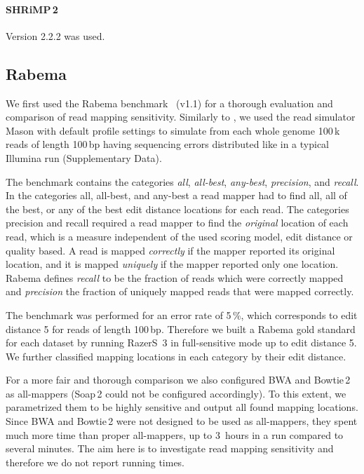 \paragraph{SHRiMP\,2}
Version 2.2.2 was used.

\subsection{Rabema}

We first used the Rabema benchmark~\citep{Holtgrewe2011} (v1.1) for a thorough evaluation and comparison of read mapping sensitivity.
Similarly to \citep{Bowtie2}, we used the read simulator Mason \citep{SeqAnReadSimulator} with default profile settings to simulate from each whole genome 100\,k reads of length 100\,bp having sequencing errors distributed like in a typical Illumina run (Supplementary Data).

The benchmark contains the categories \emph{all}, \emph{all-best}, \emph{any-best}, \emph{precision}, and \emph{recall}.
In the categories all, all-best, and any-best a read mapper had to find all, all of the best, or any of the best edit distance locations for each read.
The categories precision and recall required a read mapper to find the \emph{original} location of each read, which is a measure independent of the used scoring model, \eg edit distance or quality based.
A read is mapped \emph{correctly} if the mapper reported its original location, 
and it is mapped \emph{uniquely} if the mapper reported only one location.
Rabema defines \emph{recall} to be the fraction of reads which were correctly mapped and \emph{precision} the fraction of uniquely mapped reads that were mapped correctly.

The benchmark was performed for an error rate of 5\,\%, which corresponds to edit distance 5 for reads of length 100\,bp. Therefore we built a Rabema gold standard for each dataset by running RazerS~3 in full-sensitive mode up to edit distance 5. We further classified mapping locations in each category by their edit distance.

For a more fair and thorough comparison we also configured BWA and Bowtie\,2 as all-mappers (Soap\,2 could not be configured accordingly).
To this extent, we parametrized them to be highly sensitive and output all found mapping locations.
Since BWA and Bowtie\,2 were not designed to be used as all-mappers, they spent much more time than proper all-mappers, \ie up to 3~hours in a run compared to several minutes.
The aim here is to investigate read mapping sensitivity and therefore we do not report running times.

